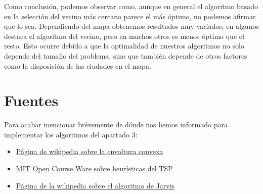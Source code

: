 \documentclass{article}
\begin{document}
Como conclusión, podemos observar como, aunque en general el algoritmo basado en la selección del vecino más cercano parece el más óptimo, no podemos afirmar que lo sea. Dependiendo del mapa obtenemos resultados muy variados; en algunos destaca el algoritmo del vecino, pero en muchos otros es menos óptimo que el resto. Esto ocurre debido a que la optimalidad de nuestros algoritmos no solo depende del tamaño del problema, sino que también depende de otros factores como la disposición de las ciudades en el mapa.



\section{Fuentes}
Para acabar mencionar brévemente de dónde nos hemos informado para implementar los algoritmos del apartado 3:
\begin{itemize}
 \item \href{https://en.wikipedia.org/wiki/Convex_hull}{Página de wikipedia sobre la envoltura convexa}
 \item \href{https://ocw.mit.edu/courses/civil-and-environmental-engineering/1-203j-logistical-and-transportation-planning-methods-fall-2006/lecture-notes/lec16.pdf}{MIT Open Course Ware sobre heurísticas del TSP}
 \item \href{https://en.wikipedia.org/wiki/Gift_wrapping_algorithm}{Página de la wikipedia sobre el algoritmo de Jarvis}
\end{itemize}
\end{document}
